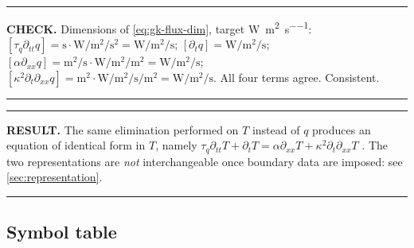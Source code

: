 \documentclass[11pt,a4paper]{article}
\theoremstyle{definition}
\newenvironment{checkbox}%
  {\par\medskip\noindent\begin{minipage}{\linewidth}%
   \rule{\linewidth}{0.4pt}\par\noindent\textbf{CHECK.}\enspace}%
  {\par\rule{\linewidth}{0.4pt}\end{minipage}\par\medskip}
\newenvironment{resultbox}%
  {\par\medskip\noindent\begin{minipage}{\linewidth}%
   \rule{\linewidth}{1.0pt}\par\noindent\textbf{RESULT.}\enspace}%
  {\par\rule{\linewidth}{1.0pt}\end{minipage}\par\medskip}
\newcommand{\tq}{\tau_{q}}
\newcommand{\kk}{\kappa^{2}}
\begin{document}
\begin{checkbox}
Dimensions of \eqref{eq:gk-flux-dim}, target
\si{\watt\per\metre\squared\per\second}:
$[\tq\partial_{tt}q]=\si{\second}\cdot\si{\watt\per\metre\squared\per\second\squared}
 =\si{\watt\per\metre\squared\per\second}$;
$[\partial_{t}q]=\si{\watt\per\metre\squared\per\second}$;
$[\alpha\partial_{xx}q]=\si{\metre\squared\per\second}\cdot
 \si{\watt\per\metre\squared\per\metre\squared}
 =\si{\watt\per\metre\squared\per\second}$;
$[\kk\partial_{t}\partial_{xx}q]=\si{\metre\squared}\cdot
 \si{\watt\per\metre\squared\per\second\per\metre\squared}
 =\si{\watt\per\metre\squared\per\second}$.
All four terms agree. Consistent.
\end{checkbox}

\begin{resultbox}
The same elimination performed on $T$ instead of $q$ produces an equation of
identical form in $T$, namely
$\tq\partial_{tt}T+\partial_{t}T=\alpha\partial_{xx}T+\kk\partial_{t}\partial_{xx}T$
\cite{Kovacs2018}. The two representations are \emph{not} interchangeable once
boundary data are imposed: see \cref{sec:representation}.
\end{resultbox}

\subsection{Symbol table}
\end{document}

